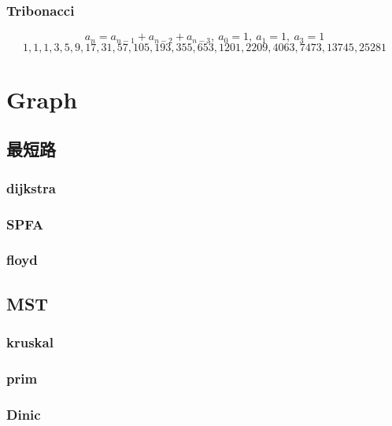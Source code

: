 \subsubsection{Tribonacci}
\[a_{n} = a_{n-1} + a_{n-2} + a_{n-3},\ a_0 = 1,\ a_1 = 1,\ a_3 = 1\]
\[1, 1, 1, 3, 5, 9, 17, 31, 57, 105, 193, 355, 653, 1201, 2209, 4063, 7473, 13745, 25281\]

\section{Graph}

\subsection{最短路}
\subsubsection{dijkstra}


\subsubsection{SPFA}


\subsubsection{floyd}


\subsection{MST}
\subsubsection{kruskal}


\subsubsection{prim}


\subsubsection{Dinic}


